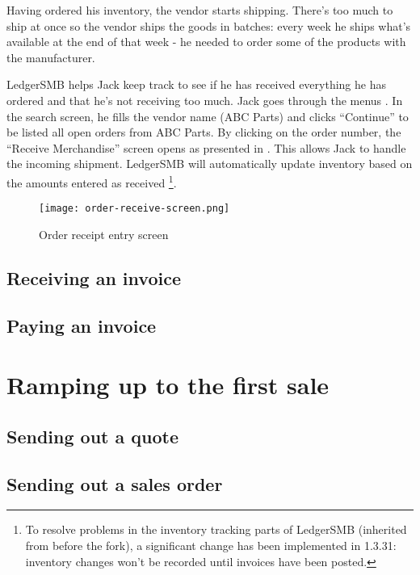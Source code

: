 Having ordered his inventory, the vendor starts shipping. There's too much to ship at once
so the vendor ships the goods in batches: every week he ships what's available at the end
of that week - he needed to order some of the products with the manufacturer.

LedgerSMB helps Jack keep track to see if he has received everything he has ordered and
that he's not receiving too much. Jack goes through the menus .
In the search screen, he fills the vendor name (ABC Parts) and clicks ``Continue'' to be listed
all open orders from ABC Parts. By clicking on the order number, the ``Receive Merchandise'' screen
opens as presented in . This allows Jack to handle the incoming
shipment. LedgerSMB will automatically update inventory based on the amounts entered as received
\footnote{To resolve problems in the inventory tracking parts of LedgerSMB (inherited from
before the fork), a significant change has been implemented in 1.3.31: inventory changes won't
be recorded until invoices have been posted.
}.

\begin{figure}[h]
\centering
\texttt{[image: order-receive-screen.png]}
\caption{Order receipt entry screen}
\label{fig:order-receive-screen}
\end{figure}

\section{Receiving an invoice}
\label{sec-stock-invoice}

\section{Paying an invoice}
\label{sec-stock-payment}



\chapter{Ramping up to the first sale}
\label{cha-ramping-up-to-the-first-sale}

\section{Sending out a quote} 
\label{sec-sending-a-quote}

\section{Sending out a sales order}
\label{sec-sending-a-sales-order}



